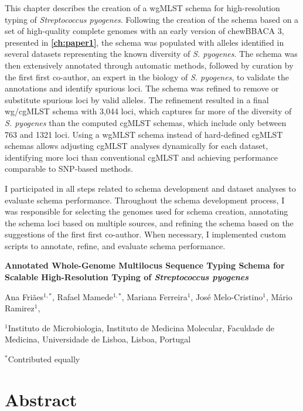 This chapter describes the creation of a \ac{wgMLST} schema for high-resolution typing of \textit{Streptococcus pyogenes}. Following the creation of the schema based on a set of high-quality complete genomes with an early version of chewBBACA 3, presented in \textbf{\autoref{ch:paper1}}, the schema was populated with alleles identified in several datasets representing the known diversity of \textit{S. pyogenes}. The schema was then extensively annotated through automatic methods, followed by curation by the first first co-author, an expert in the biology of \textit{S. pyogenes}, to validate the annotations and identify spurious loci. The schema was refined to remove or substitute spurious loci by valid alleles. The refinement resulted in a final \ac{wg/cgMLST} schema with 3,044 loci, which captures far more of the diversity of \textit{S. pyogenes} than the computed \ac{cgMLST} schemas, which include only between 763 and 1321 loci. Using a \ac{wgMLST} schema instead of hard-defined \ac{cgMLST} schemas allows adjusting \ac{cgMLST} analyses dynamically for each dataset, identifying more loci than conventional \ac{cgMLST} and achieving performance comparable to \ac{SNP}-based methods.

I participated in all steps related to schema development and dataset analyses to evaluate schema performance. Throughout the schema development process, I was responsible for selecting the genomes used for schema creation, annotating the schema loci based on multiple sources, and refining the schema based on the suggestions of the first first co-author. When necessary, I implemented custom scripts to annotate, refine, and evaluate schema performance.

\newpage 

\begin{center}
\large
\textbf{Annotated Whole-Genome Multilocus Sequence Typing Schema for Scalable High-Resolution Typing of \textit{Streptococcus pyogenes}}
\end{center}

Ana Friães$^{1,*}$, 
Rafael Mamede$^{1,*}$, 
Mariana Ferreira$^1$,
José Melo-Cristino$^1$, 
Mário Ramirez$^1$,

$^1$Instituto de Microbiologia, Instituto de Medicina Molecular, Faculdade de Medicina, Universidade de Lisboa, Lisboa, Portugal 

$^*$Contributed equally

\section{Abstract} \label{sec:ch4_abstract}

